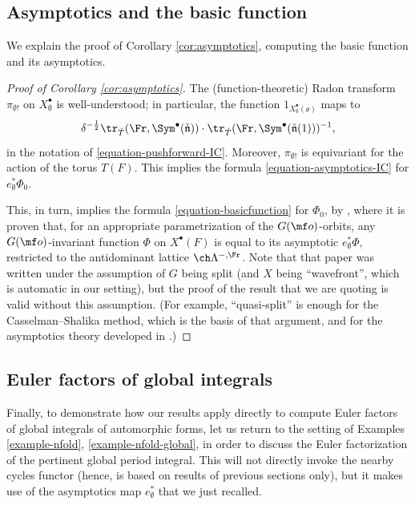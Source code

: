 \subsection{Asymptotics and the basic function} \label{sect:asymptotics}

We explain the proof of Corollary \ref{cor:asymptotics}, computing the basic function and its asymptotics.

\begin{proof}[Proof of Corollary \ref{cor:asymptotics}]
The (function-theoretic) Radon transform $\pi_{\emptyset !}$ on $X_\emptyset^\bullet$ is well-understood; in particular, the function $1_{X_\emptyset^\bullet(\mathfrak o)}$ maps to
\[ \delta^{-\frac{1}{2}} \tr_{\check T}(\Fr, \Sym^\bullet (\check{\mathfrak n})) \cdot \tr_{\check T}(\Fr, \Sym^\bullet (\check{\mathfrak n}(1)))^{-1},\]
in the notation of \eqref{equation-pushforward-IC}. Moreover, $\pi_{\emptyset !}$ is equivariant for the action of the torus $T(F)$. This implies the formula \eqref{equation-asymptotics-IC} for $e_\emptyset^*\Phi_0$.

This, in turn, implies the formula \eqref{equation-basicfunction} for $\Phi_0$, by \cite[Corollary 5.5]{SaSatake}, where it is proven that, for an appropriate parametrization of the $G(\mf o)$-orbits, any $G(\mf o)$-invariant function $\Phi$ on $X^\bullet(F)$ is equal to its asymptotic $e_\emptyset^* \Phi$, restricted to the antidominant lattice $\ch\Lambda^{-,\Fr}$. Note that that paper was written under the assumption of $G$ being split (and $X$ being ``wavefront'', which is automatic in our setting), but the proof of the result that we are quoting is valid without this assumption. (For example, ``quasi-split'' is enough for the Casselman--Shalika method, which is the basis of that argument, and for the asymptotics theory developed in \cite{SV}.)
\end{proof}



\subsection{Euler factors of global integrals} \label{sect:nfold-explanation}


Finally, to demonstrate how our results apply directly to compute Euler factors of global integrals of automorphic forms, let us return to the setting of Examples \ref{example-nfold}, \ref{example-nfold-global}, in order to discuss the Euler factorization of the pertinent global period integral. This will not directly invoke the nearby cycles functor (hence, is based on results of previous sections only), but it makes use of the asymptotics map $e_\emptyset^*$ that we just recalled.

